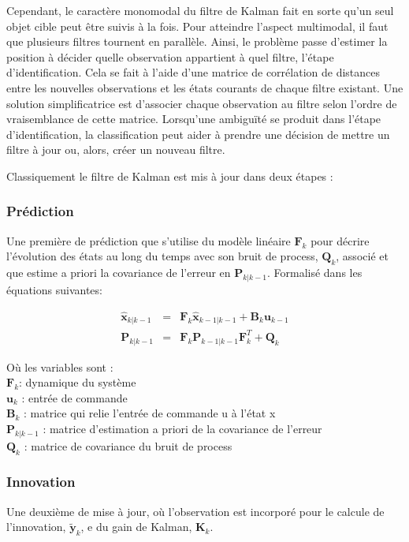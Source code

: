 Cependant, le caractère monomodal du filtre de Kalman fait en sorte
qu'un seul objet cible peut être suivis à la fois. Pour atteindre
l'aspect multimodal, il faut que plusieurs filtres tournent en
parallèle. Ainsi, le problème passe d’estimer la position à décider
quelle observation appartient à quel filtre, l'étape
d'identification. Cela se fait à l'aide d'une matrice de corrélation
de distances entre les nouvelles observations et les états courants de
chaque filtre existant. Une solution simplificatrice est d'associer
chaque observation au filtre selon l'ordre de vraisemblance de cette
matrice. Lorsqu’une ambiguïté se produit dans l'étape
d'identification, la classification peut aider à prendre une décision
de mettre un filtre à jour ou, alors, créer un nouveau filtre.

Classiquement le filtre de Kalman est mis à jour dans deux étapes : 

\subsubsection{Prédiction} Une première de prédiction que s'utilise du modèle linéaire $\textbf{F}_{k}$ pour décrire l'évolution des états au long du temps avec son bruit de process, $\textbf{Q}_{k}$, associé et que estime a priori la covariance de l'erreur en $\textbf{P}_{k|k-1}$. Formalisé dans les équations suivantes:

\begin{equation*}
	\begin{array}{ccl}
		\hat{\textbf{x}}_{k|k-1} &=& \textbf{F}_{k}\hat{\textbf{x}}_{k-1|k-1} + \textbf{B}_{k} \textbf{u}_{k-1}\\
		\textbf{P}_{k|k-1} &=& \textbf{F}_{k} \textbf{P}_{k-1|k-1} \textbf{F}_{k}^{T} + \textbf{Q}_{k}
	\end{array}
\end{equation*}

\noindent Où les variables sont : \\ 
$\textbf{F}_{k}$: dynamique du système \\
$\textbf{u}_{k}$ : entrée de commande \\
$\textbf{B}_{k}$ : matrice qui relie l'entrée de commande u à l'état x \\ 
$\textbf{P}_{k|k-1}$ : matrice d'estimation a priori de la covariance de l'erreur \\
$\textbf{Q}_{k}$ : matrice de covariance du bruit de process

\subsubsection{Innovation}
Une deuxième de mise à jour, où l'observation est incorporé pour le calcule de l'innovation, $\tilde{\textbf{y}}_{k}$, e du gain de Kalman, $\textbf{K}_{k}$.

